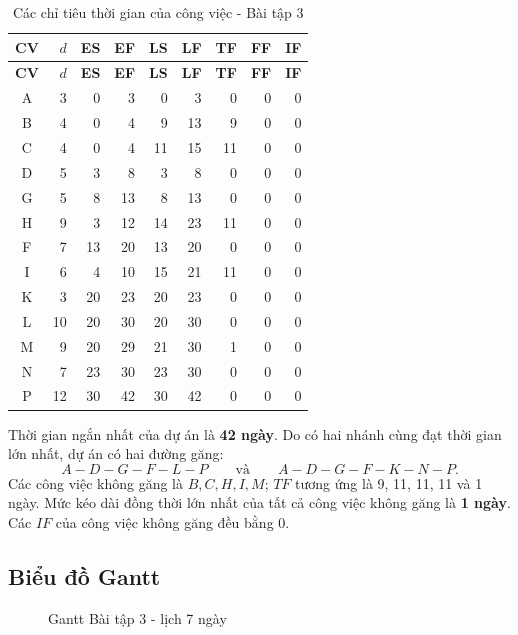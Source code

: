 \begin{longtable}{c|r|rr|rr|rrr}
\caption{Các chỉ tiêu thời gian của công việc - Bài tập 3}\\
\toprule
\textbf{CV}&\textbf{$d$}&\textbf{ES}&\textbf{EF}&\textbf{LS}&\textbf{LF}&\textbf{TF}&\textbf{FF}&\textbf{IF}\\
\midrule
\endfirsthead
\toprule
\textbf{CV}&\textbf{$d$}&\textbf{ES}&\textbf{EF}&\textbf{LS}&\textbf{LF}&\textbf{TF}&\textbf{FF}&\textbf{IF}\\
\midrule
\endhead
A&3&0&3&0&3&0&0&0\\
B&4&0&4&9&13&9&0&0\\
C&4&0&4&11&15&11&0&0\\
D&5&3&8&3&8&0&0&0\\
G&5&8&13&8&13&0&0&0\\
H&9&3&12&14&23&11&0&0\\
F&7&13&20&13&20&0&0&0\\
I&6&4&10&15&21&11&0&0\\
K&3&20&23&20&23&0&0&0\\
L&10&20&30&20&30&0&0&0\\
M&9&20&29&21&30&1&0&0\\
N&7&23&30&23&30&0&0&0\\
P&12&30&42&30&42&0&0&0\\
\bottomrule
\end{longtable}

Thời gian ngắn nhất của dự án là \textbf{42 ngày}. Do có hai nhánh cùng đạt
thời gian lớn nhất, dự án có hai đường găng:
\[
\boxed{A-D-G-F-L-P}
\qquad\text{và}\qquad
\boxed{A-D-G-F-K-N-P}.
\]
Các công việc không găng là $B,C,H,I,M$; $TF$ tương ứng là 9, 11, 11, 11
và 1 ngày. Mức kéo dài đồng thời lớn nhất của tất cả công việc không găng là
\textbf{1 ngày}. Các $IF$ của công việc không găng đều bằng 0.

\subsection{Biểu đồ Gantt}

\begin{figure}[H]\centering
{}
\caption{Gantt Bài tập 3 - lịch 7 ngày}
\end{figure}

